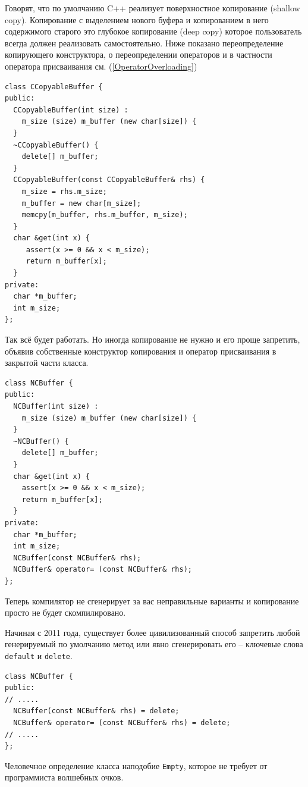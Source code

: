 \documentclass[a4paper,12pt,oneside]{article}
\begin{document}
Говорят, что по умолчанию C++ реализует поверхностное копирование (shallow copy). Копирование с выделением нового буфера и копированием в него содержимого старого это глубокое копирование (deep copy) которое пользователь всегда должен реализовать самостоятельно. Ниже показано переопределение копирующего конструктора, о переопределении операторов и в частности оператора присваивания см. (\ref{OperatorOverloading})

\begin{lstlisting}
class CCopyableBuffer {
public:
  CCopyableBuffer(int size) : 
    m_size (size) m_buffer (new char[size]) {
  }
  ~CCopyableBuffer() { 
    delete[] m_buffer; 
  }
  CCopyableBuffer(const CCopyableBuffer& rhs) { 
    m_size = rhs.m_size; 
    m_buffer = new char[m_size];
    memcpy(m_buffer, rhs.m_buffer, m_size);
  } 
  char &get(int x) { 
     assert(x >= 0 && x < m_size); 
     return m_buffer[x]; 
  } 
private:
  char *m_buffer;
  int m_size;
};
\end{lstlisting}

Так всё будет работать. Но иногда копирование не нужно и его проще запретить, объявив собственные конструктор копирования и оператор присваивания в закрытой части класса.

\begin{lstlisting}
class NCBuffer {
public:
  NCBuffer(int size) : 
    m_size (size) m_buffer (new char[size]) {
  }
  ~NCBuffer() { 
    delete[] m_buffer; 
  }
  char &get(int x) { 
    assert(x >= 0 && x < m_size); 
    return m_buffer[x]; 
  }
private:
  char *m_buffer;
  int m_size;
  NCBuffer(const NCBuffer& rhs);
  NCBuffer& operator= (const NCBuffer& rhs);
};
\end{lstlisting}

Теперь компилятор не сгенерирует за вас неправильные варианты и копирование просто не будет скомпилировано.

Начиная с 2011 года, существует более цивилизованный способ запретить любой генерируемый по умолчанию метод или явно сгенерировать его -- ключевые слова \lstinline!default! и \lstinline!delete!.

\begin{lstlisting}
class NCBuffer {
public:
// .....
  NCBuffer(const NCBuffer& rhs) = delete;
  NCBuffer& operator= (const NCBuffer& rhs) = delete;
// .....
};
\end{lstlisting}

Человечное определение класса наподобие \lstinline!Empty!, которое не требует от программиста волшебных очков.
\end{document}
